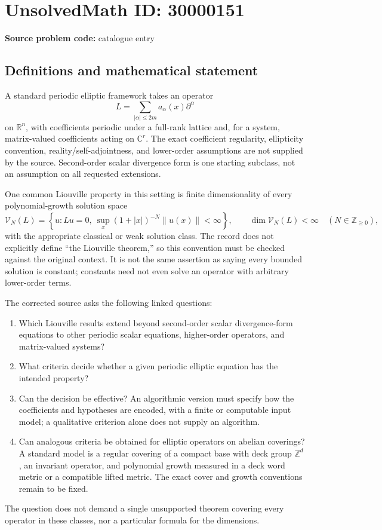 \documentclass[11pt]{article}
\newcommand{\Z}{\mathbb{Z}}
\newcommand{\R}{\mathbb{R}}
\newcommand{\C}{\mathbb{C}}
\begin{document}
\section*{UnsolvedMath ID: 30000151}
\textbf{Source problem code:} catalogue entry
\subsection{Definitions and mathematical statement}
A standard periodic elliptic framework takes an operator
\[
 L=\sum_{|\alpha|\leq2m}a_\alpha(x)\partial^\alpha
\]
on \(\R^n\), with coefficients periodic under a full-rank lattice and, for a system, matrix-valued coefficients acting on \(\C^r\). The exact coefficient regularity, ellipticity convention, reality/self-adjointness, and lower-order assumptions are not supplied by the source. Second-order scalar divergence form is one starting subclass, not an assumption on all requested extensions.

One common Liouville property in this setting is finite dimensionality of every polynomial-growth solution space
\[
 \mathcal V_N(L)=\left\{u:Lu=0,\ \sup_x(1+|x|)^{-N}\|u(x)\|<\infty\right\},
 \qquad\dim\mathcal V_N(L)<\infty\quad(N\in\Z_{\geq0}),
\]
with the appropriate classical or weak solution class. The record does not explicitly define ``the Liouville theorem,'' so this convention must be checked against the original context. It is not the same assertion as saying every bounded solution is constant; constants need not even solve an operator with arbitrary lower-order terms.

The corrected source asks the following linked questions:
\begin{enumerate}
\item Which Liouville results extend beyond second-order scalar divergence-form equations to other periodic scalar equations, higher-order operators, and matrix-valued systems?
\item What criteria decide whether a given periodic elliptic equation has the intended property?
\item Can the decision be effective? An algorithmic version must specify how the coefficients and hypotheses are encoded, with a finite or computable input model; a qualitative criterion alone does not supply an algorithm.
\item Can analogous criteria be obtained for elliptic operators on abelian coverings? A standard model is a regular covering of a compact base with deck group \(\Z^d\), an invariant operator, and polynomial growth measured in a deck word metric or a compatible lifted metric. The exact cover and growth conventions remain to be fixed.
\end{enumerate}
The question does not demand a single unsupported theorem covering every operator in these classes, nor a particular formula for the dimensions.
\end{document}
